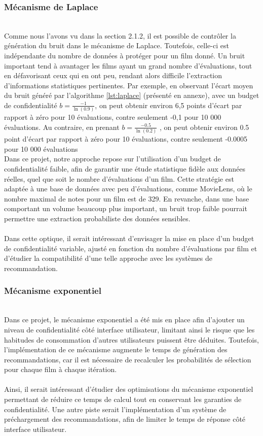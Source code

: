 \documentclass{article}
\begin{document}
\subsubsection{Mécanisme de Laplace}
$ $\\
Comme nous l’avons vu dans la section 2.1.2, il est possible de contrôler la génération du bruit dans le mécanisme de Laplace.
Toutefois, celle-ci est indépendante du nombre de données à protéger pour un film donné. Un bruit important tend à avantager les
films ayant un grand nombre d’évaluations, tout en défavorisant ceux qui en ont peu, rendant alors difficile l’extraction d’informations
statistiques pertinentes. Par exemple, en observant l’écart moyen du bruit généré par l’algorithme \ref{lst:laplace} (présenté en annexe),
avec un budget de confidentialité $b= \frac{-1}{\ln(0.9)}$, on peut obtenir environ 6,5 points d’écart par rapport à zéro pour 10
évaluations, contre seulement -0,1 pour 10 000 évaluations. Au contraire, en prenant $b= \frac{-0.5}{\ln(0.2)}$ , on peut obtenir environ
0.5 point d’écart par rapport à zéro pour 10 évaluations, contre seulement -0.0005 pour 10 000 évaluations\\
Dans ce projet, notre approche repose sur l’utilisation d’un budget de confidentialité faible, afin de garantir une étude statistique
fidèle aux données réelles, quel que soit le nombre d’évaluations d’un film. Cette stratégie est adaptée à une base de données avec
peu d’évaluations, comme MovieLens, où le nombre maximal de notes pour un film est de 329. En revanche, dans une base comportant un volume
beaucoup plus important, un bruit trop faible pourrait permettre une extraction probabiliste des données sensibles.\\
\\
Dans cette optique, il serait intéressant d’envisager la mise en place d’un budget de confidentialité variable, ajusté en fonction du nombre d’évaluations
par film et d'étudier la compatibilité d'une telle approche avec les systèmes de recommandation.

\subsubsection{Mécanisme exponentiel}
$ $\\
Dans ce projet, le mécanisme exponentiel a été mis en place afin d’ajouter un niveau de confidentialité côté interface utilisateur, limitant
ainsi le risque que les habitudes de consommation d'autres utilisateurs puissent être déduites. Toutefois, l’implémentation de ce mécanisme
augmente le temps de génération des recommandations, car il est nécessaire de recalculer les probabilités de sélection pour chaque film à chaque itération.\\
\\
Ainsi, il serait intéressant d’étudier des optimisations du mécanisme exponentiel permettant de réduire ce temps de calcul tout en conservant les garanties
de confidentialité. Une autre piste serait l’implémentation d’un système de préchargement des recommandations, afin de limiter le temps de réponse côté interface utilisateur.
\end{document}
